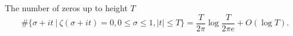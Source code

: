 \begin{theorem}
	The number of zeros up to height $T$\[
	\#\{\sigma+it \ | \ \zeta(\sigma+it)=0,0 \leq \sigma\leq 1, |t|\leq T \} = \frac{T}{2\pi}\log{\frac{T}{2\pi e}} + O(\log T).
	\]
\end{theorem}

